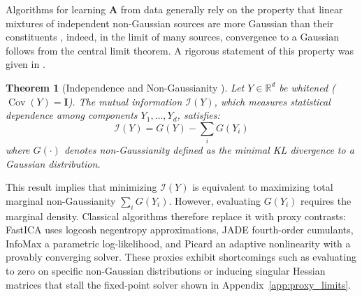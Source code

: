 \documentclass[accepted]{tpm2026} %
\newtheorem{theorem}{Theorem}
\begin{document}
Algorithms for learning $\mathbf{A}$ from data generally rely on the property that linear mixtures of independent non-Gaussian sources are more Gaussian than their constituents \citep{hyvarinen2001}, indeed, in the limit of many sources, convergence to a Gaussian follows from the central limit theorem.
A rigorous statement of this property was given in \citet{cardoso2022}.

\begin{theorem}[Independence and Non-Gaussianity \citep{cardoso2022}]
Let $Y \in \mathbb{R}^d$ be whitened ($\operatorname{Cov}(Y)=\mathbf{I}$). The mutual information $\mathscr{I}(Y)$, which measures statistical dependence among components $Y_1,\ldots,Y_d$, satisfies:
\begin{equation}
    \mathscr{I}(Y) = G(Y) - \sum_{i} G(Y_i)
\end{equation}
where $G(\cdot)$ denotes non-Gaussianity defined as the minimal KL divergence to a Gaussian distribution. 
\end{theorem}
This result implies that
minimizing $\mathscr{I}(Y)$  is equivalent to maximizing total marginal non-Gaussianity $\sum_i G(Y_i)$.
However, evaluating $G(Y_i)$ requires the marginal density. Classical algorithms therefore replace it with proxy contrasts:
FastICA \citep{hyvarinen2001, amari1996new} uses logcosh negentropy approximations, 
JADE \citep{cardoso1993blind} fourth-order cumulants, 
InfoMax \citep{bell1995information} a parametric log-likelihood, and 
Picard \citep{ablin2018faster} an adaptive nonlinearity with a provably converging solver. These proxies exhibit shortcomings such as evaluating to zero on specific non-Gaussian distributions or inducing singular Hessian matrices that stall the fixed-point solver shown in Appendix~\ref{app:proxy_limits}.
\end{document}
